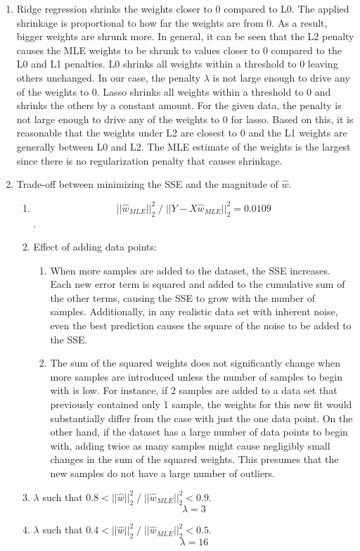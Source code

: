 \documentclass[english]{article}
\begin{document}
\begin{enumerate}
\item Ridge regression shrinks the weights closer to $0$ compared to L0. The applied shrinkage is proportional to how far the weights are from $0$. As a result, bigger weights are shrunk more. In general, it can be seen that the L2 penalty causes the MLE weights to be shrunk to values closer to $0$ compared to the L0 and L1 penalties. 
L0 shrinks all weights within a threshold to $0$ leaving others unchanged. In our case, the penalty $\lambda$ is not large enough to drive any of the weights to $0$. Lasso shrinks all weights within a threshold to $0$ and shrinks the others by a constant amount. For the given data, the penalty is not large enough to drive any of the weights to $0$ for lasso. Based on this, it is reasonable that the weights under L2 are closest to $0$ and the L1 weights are generally between L0 and L2. 
The MLE estimate of the weights is the largest since there is no regularization penalty that causes shrinkage. 

\item Trade-off between minimizing the SSE and the magnitude of $\hat{w}$.
\begin{enumerate}

\item $$||\hat{w}_{MLE}||_2^2  \; / \; ||Y-X\hat{w}_{MLE}||_2^2 = 0.0109$$.

\item Effect of adding data points:
\begin{enumerate}
\item When more samples are added to the dataset, the SSE increases. Each new error term is squared and added to the cumulative sum of the other terms, causing the SSE to grow with the number of samples. Additionally, in any realistic data set with inherent noise, even the best prediction causes the square of the noise to be added to the SSE.
\item The sum of the squared weights does not significantly change when more samples are introduced unless the number of samples to begin with is low. For instance, if 2 samples are added to a data set that previously contained only 1 sample, the weights for this new fit would substantially differ from the case with just the one data point. On the other hand, if the dataset has a large number of data points to begin with, adding twice as many samples might cause negligibly small changes in the sum of the squared weights. This presumes that the new samples do not have a large number of outliers.  \\
\end{enumerate}

\item $\lambda$ such that $0.8 < ||\hat{w}||_2^2 \; / \; ||\hat{w}_{MLE}||_2^2 < 0.9$.
$$\lambda = 3$$

\item $\lambda$ such that $0.4 < ||\hat{w}||_2^2 \; / \; ||\hat{w}_{MLE}||_2^2 < 0.5$.
$$\lambda = 16$$
\end{enumerate}

\end{enumerate}
\end{document}
